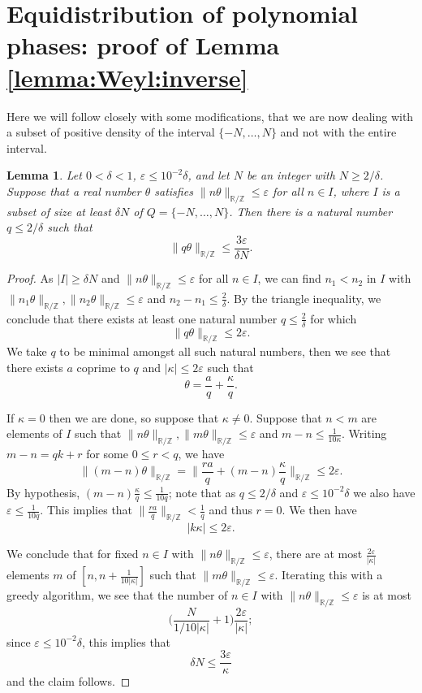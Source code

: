 \documentclass[reqno]{amsart}
\newcommand\R{{\mathbb{R}}}
\newcommand\Z{{\mathbb{Z}}}
\newcommand\eps{{\varepsilon}}
\theoremstyle{plain}
\newtheorem{lemma}[theorem]{Lemma}
\theoremstyle{definition}
\begin{document}
\section{Equidistribution of polynomial phases: proof of Lemma \ref{lemma:Weyl:inverse}}\label{sect:Dio}
Here we will follow \cite{Tao} closely with some modifications, that we are now dealing with a subset of positive density of the interval $\{-N,\dots,N\}$ and not with the entire interval.

\begin{lemma}\cite[Lemma 3]{Tao}\label{lemma:equi:1} 
Let $0<\delta<1$, $\eps\le 10^{-2}\delta$, and let $N$ be an integer with $N\ge 2/\delta$. %
Suppose that a real number $\theta$ satisfies $\|n\theta\|_{\R/\Z} \leq \eps$ for all $n\in I$, where $I$ is a subset of size at least $\delta N$ of $Q=\{-N,\dots, N\}$. 
Then there is a natural number $q \leq 2/\delta$ such that
\[
\| q \theta \|_{\R/\Z} \le \frac{3\eps}{\delta N}.
\]
\end{lemma}

\begin{proof} As $|I| \ge \delta N$ and $\|n\theta\|_{\R/\Z} \leq \eps$ for all $n\in I$, we can find $n_1 < n_2$ in $I$ with $\|n_1 \theta \|_{\R/\Z}, \|n_2 \theta \|_{\R/\Z} \leq \eps$ and $n_2-n_1 \leq \frac{2}{\delta}$. By the triangle inequality, we conclude that there exists at least one natural number $q \leq \frac{2}{\delta}$ for which
\[
\| q \theta \|_{\R/\Z} \leq 2\eps.
\]
We take $q$ to be minimal amongst all such natural numbers, then we see that there exists $a$ coprime to $q$ and $|\kappa| \leq 2\eps$ such that
\begin{equation}\label{eq:kappa}
\theta = \frac{a}{q} + \frac{\kappa}{q}.
\end{equation}

If $\kappa=0$ then we are done, so suppose that $\kappa \neq 0$. Suppose that $n < m$ are elements of $I$ such that $\|n\theta \|_{\R/\Z}, \|m\theta \|_{\R/\Z} \leq \eps$ and $m-n \leq \frac{1}{10 \kappa}$. Writing $m-n = qk + r$ for some $0 \leq r < q$, we have
\[
\| (m-n) \theta \|_{\R/\Z} = \Big\| \frac{ra}{q} + (m-n) \frac{\kappa}{q} \Big\|_{\R/\Z} \leq 2\eps.
\]
By hypothesis, $(m-n) \frac{\kappa}{q} \leq \frac{1}{10 q}$; note that as $q \leq 2/\delta$ and $\eps \leq 10^{-2} \delta$ we also have $\eps \leq \frac{1}{10q}$. This implies that $\| \frac{ra}{q} \|_{\R/\Z} < \frac{1}{q}$ and thus $r=0$. We then have
\[
|k \kappa| \leq 2 \eps.
\]

We conclude that for fixed $n \in I$ with $\|n\theta \|_{\R/\Z} \leq \eps$, there are at most $\frac{2\eps}{|\kappa|}$ elements $m$ of $[n, n + \frac{1}{10 |\kappa|}]$ such that $\|m\theta \|_{\R/\Z} \leq \eps$. Iterating this with a greedy algorithm, we see that the number of $n \in I$ with $\|n\theta \|_{\R/\Z} \leq \eps$ is at most 
\[
\Big( \frac{N}{1/10|\kappa|} + 1 \Big) \frac{2\eps}{|\kappa|};
\] 
since $\eps \le 10^{-2} \delta$, this implies that
\[
\delta N \le \frac{3 \eps}{\kappa}
\]
and the claim follows.
\end{proof}
\end{document}
